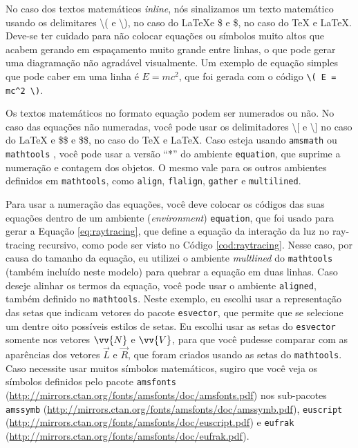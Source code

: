 No caso dos textos matemáticos \textit{inline}, nós sinalizamos um texto matemático usando os delimitares \textbackslash ( e \textbackslash ), no caso do \LaTeX e \$ e \$, no caso do \TeX{} e \LaTeX{}. Deve-se ter cuidado para não colocar equações ou símbolos muito altos que acabem gerando em espaçamento muito grande entre linhas, o que pode gerar uma diagramação não agradável visualmente. Um exemplo de equação simples que pode caber em uma linha é \( E = m c^2 \), que foi gerada com o código
\texttt{\textbackslash ( E = mc\^{}2 \textbackslash )}.

Os textos matemáticos no formato equação podem ser numerados ou não. No caso das equações não numeradas, você pode usar os delimitadores \textbackslash [ e \textbackslash ] no caso do \LaTeX{} e \$\$ e \$\$, no caso do \TeX{} e \LaTeX{}. Caso esteja usando \texttt{amsmath} \parencite{amsmath} ou \texttt{mathtools} \parencite{mathtools}, você pode usar a versão ``*'' do ambiente \texttt{equation}, que suprime a numeração e contagem dos objetos. O mesmo vale para os outros ambientes definidos em \texttt{mathtools}, como \texttt{align}, \texttt{flalign}, \texttt{gather} e \texttt{multilined}. 

Para usar a numeração das equações, você deve colocar os códigos das suas equações dentro de um ambiente (\textit{environment}) \texttt{equation}, que foi usado para gerar a Equação \ref{eq:raytracing}, que define a equação da interação da luz no ray-tracing recursivo, como pode ser visto no Código \ref{cod:raytracing}. Nesse caso, por causa do tamanho da equação, eu utilizei o ambiente \textit{multlined} do \texttt{mathtools} (também incluído neste modelo) para quebrar a equação em duas linhas. Caso deseje alinhar os termos da equação, você pode usar o ambiente \texttt{aligned}, também definido no \texttt{mathtools}. Neste exemplo, eu escolhi usar a representação das setas que indicam vetores do pacote \texttt{esvector}, que permite que se selecione um dentre oito possíveis estilos de setas. Eu escolhi usar as setas do \texttt{esvector} somente nos vetores $\vv{N}$ e $\vv{V}$, para que você pudesse comparar com as aparências dos vetores $\overrightarrow{L}$ e $\overrightarrow{R}$, que foram criados usando as setas do \texttt{mathtools}. Caso necessite usar muitos símbolos matemáticos, sugiro que você veja os símbolos definidos pelo pacote \texttt{amsfonts} (\url{http://mirrors.ctan.org/fonts/amsfonts/doc/amsfonts.pdf}) nos sub-pacotes \texttt{amssymb} (\url{http://mirrors.ctan.org/fonts/amsfonts/doc/amssymb.pdf}), \texttt{euscript} (\url{http://mirrors.ctan.org/fonts/amsfonts/doc/euscript.pdf}) e \texttt{eufrak} (\url{http://mirrors.ctan.org/fonts/amsfonts/doc/eufrak.pdf}).
 
